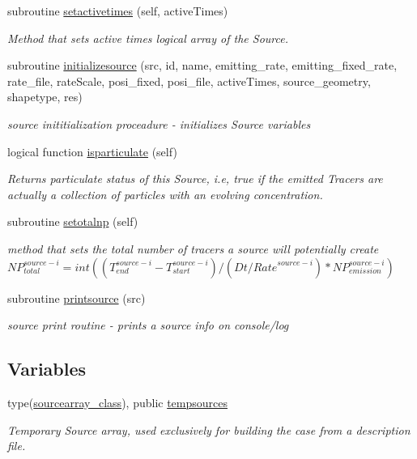 \begin{DoxyCompactItemize}
subroutine \mbox{\hyperlink{namespacesources__mod_af1e3a9c32dc0c7dbea57d1b05183a696}{setactivetimes}} (self, active\+Times)
\begin{DoxyCompactList}\small\item\em Method that sets active times logical array of the Source. \end{DoxyCompactList}\item 
subroutine \mbox{\hyperlink{namespacesources__mod_abbddcd8606c9bf9463ffe6eaf1e9cbfd}{initializesource}} (src, id, name, emitting\+\_\+rate, emitting\+\_\+fixed\+\_\+rate, rate\+\_\+file, rate\+Scale, posi\+\_\+fixed, posi\+\_\+file, active\+Times, source\+\_\+geometry, shapetype, res)
\begin{DoxyCompactList}\small\item\em source inititialization proceadure -\/ initializes Source variables \end{DoxyCompactList}\item 
logical function \mbox{\hyperlink{namespacesources__mod_ac4e4f33da78d030e1b56a48789da6a05}{isparticulate}} (self)
\begin{DoxyCompactList}\small\item\em Returns particulate status of this Source, i.\+e, true if the emitted Tracers are actually a collection of particles with an evolving concentration. \end{DoxyCompactList}\item 
subroutine \mbox{\hyperlink{namespacesources__mod_a9a62c41b71d2d6ad85def74087542ef5}{setotalnp}} (self)
\begin{DoxyCompactList}\small\item\em method that sets the total number of tracers a source will potentially create ${NP}_{total}^{source-i}=int((T_{end}^{source-i}-T_{start}^{source-i})/(Dt/{Rate}^{source-i})*{NP}_{emission}^{source-i})$ \end{DoxyCompactList}\item 
subroutine \mbox{\hyperlink{namespacesources__mod_a641fe9ecc295e486a714c1aaa133d991}{printsource}} (src)
\begin{DoxyCompactList}\small\item\em source print routine -\/ prints a source info on console/log \end{DoxyCompactList}\end{DoxyCompactItemize}
\subsection*{Variables}
\begin{DoxyCompactItemize}
\item 
type(\mbox{\hyperlink{structsources__mod_1_1sourcearray__class}{sourcearray\+\_\+class}}), public \mbox{\hyperlink{namespacesources__mod_adafecf0cf9ade0b7a85421a5801a920e}{tempsources}}
\begin{DoxyCompactList}\small\item\em Temporary Source array, used exclusively for building the case from a description file. \end{DoxyCompactList}\end{DoxyCompactItemize}


